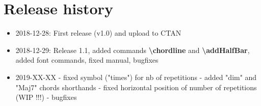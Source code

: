 \documentclass[11pt]{article}
\newcommand{\btt}{\bfseries \ttfamily }
\newcommand{\tbs}{\textbackslash{}}
\begin{document}
\section{Release history}

\begin{itemize}
\item 2018-12-28: First release (v1.0) and upload to CTAN

\item 2018-12-29: Release 1.1, added commands {\btt \tbs chordline} and {\btt \tbs addHalfBar}, added font commands, fixed manual, bugfixes

\item 2019-XX-XX
 - fixed symbol ("times") for nb of repetitions
 - added "dim" and "Maj7" chords shorthands
 - fixed horizontal position of number of repetitions (WIP !!!)
 - bugfixes
\end{itemize}
\end{document}
